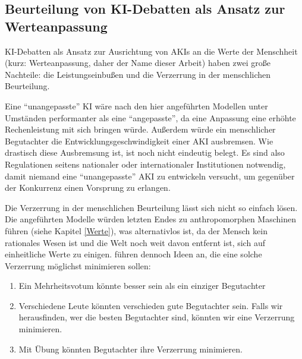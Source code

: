 \subsection{Beurteilung von KI-Debatten als Ansatz zur Werteanpassung}

KI-Debatten als Ansatz zur Ausrichtung von AKIs an die Werte der Menschheit (kurz: Werteanpassung, daher der Name dieser Arbeit) haben zwei große Nachteile: die Leistungseinbußen und die Verzerrung in der menschlichen Beurteilung.

Eine \enquote{unangepasste} KI wäre nach den hier angeführten Modellen unter Umständen performanter als eine \enquote{angepasste}, da eine Anpassung eine erhöhte Rechenleistung mit sich bringen würde.  Außerdem würde ein menschlicher Begutachter die Entwicklungsgeschwindigkeit einer AKI ausbremsen. Wie drastisch diese Ausbremsung ist, ist noch nicht eindeutig belegt. Es sind also Regulationen seitens nationaler oder internationaler Institutionen notwendig, damit niemand eine \enquote{unangepasste} AKI zu entwickeln versucht, um gegenüber der Konkurrenz einen Vorsprung zu erlangen.

Die Verzerrung in der menschlichen Beurteilung lässt sich nicht so einfach lösen. Die angeführten Modelle würden letzten Endes zu anthropomorphen Maschinen führen (siehe Kapitel \ref{Werte}), was alternativlos ist, da der Mensch kein rationales Wesen ist und die Welt noch weit davon entfernt ist, sich auf einheitliche Werte zu einigen. \citeauthor{irving_ai_2018} führen dennoch Ideen an, die eine solche Verzerrung möglichst minimieren sollen:

\begin{enumerate}
\item Ein Mehrheitsvotum könnte besser sein als ein einziger Begutachter
\item Verschiedene Leute könnten verschieden gute Begutachter sein. Falls wir herausfinden, wer die besten Begutachter sind, könnten wir eine Verzerrung minimieren.
\item Mit Übung könnten Begutachter ihre Verzerrung minimieren. 
\end{enumerate}





